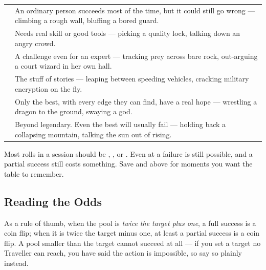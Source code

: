 \begin{statblock}
\begin{tabularx}{\linewidth}{@{}l Y@{}}
  & An ordinary person succeeds most of the time, but it could still go wrong --- climbing a rough wall, bluffing a bored guard.\\[3pt]
  & Needs real skill or good tools --- picking a quality lock, talking down an angry crowd.\\[3pt]
  & A challenge even for an expert --- tracking prey across bare rock, out-arguing a court wizard in her own hall.\\[3pt]
  & The stuff of stories --- leaping between speeding vehicles, cracking military encryption on the fly.\\[3pt]
  & Only the best, with every edge they can find, have a real hope --- wrestling a dragon to the ground, swaying a god.\\[3pt]
  & Beyond legendary. Even the best will usually fail --- holding back a collapsing mountain, talking the sun out of rising.\\
\end{tabularx}
\end{statblock}

Most rolls in a session should be , , or .
Even at  a failure is still possible, and a partial success
still costs something. Save  and above for moments you want the
table to remember.

\subsection*{Reading the Odds}
As a rule of thumb, when the pool is \emph{twice the target plus one},
a full success is a coin flip; when it is twice the target minus one,
at least a partial success is a coin flip. A pool smaller than the target cannot
succeed at all --- if you set a target no Traveller can reach, you have
said the action is impossible, so say so plainly instead.

